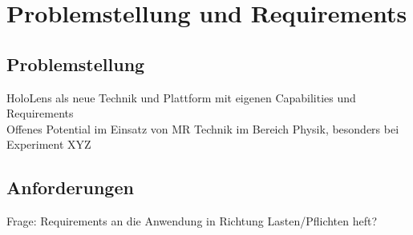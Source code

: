 \section{Problemstellung und Requirements}
\label{sec-3}

\subsection{Problemstellung}
\label{sec-3-1}
HoloLens als neue Technik und Plattform mit eigenen Capabilities und Requirements \\
Offenes Potential im Einsatz von MR Technik im Bereich Physik, besonders bei Experiment XYZ\\

\subsection{Anforderungen}
\label{sec-3-2}
Frage: Requirements an die Anwendung in Richtung Lasten/Pflichten heft?\\
